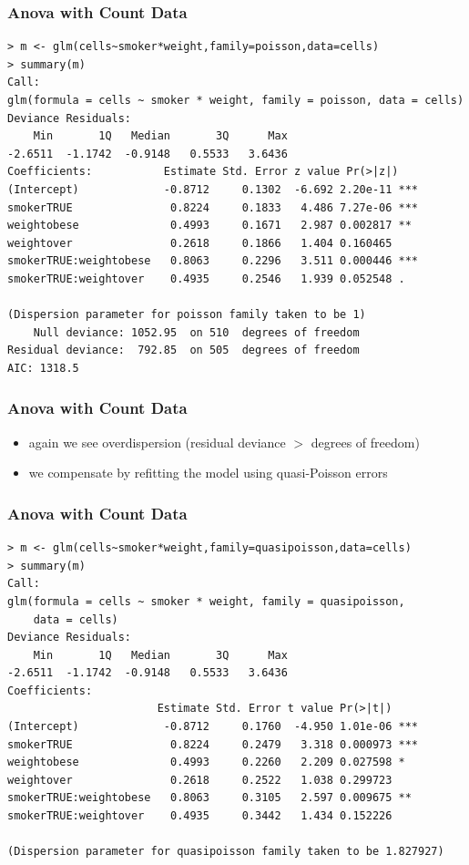 \begin{frame}[fragile]\frametitle{Anova with Count Data}
\footnotesize
\begin{verbatim}
> m <- glm(cells~smoker*weight,family=poisson,data=cells)
> summary(m)
Call:
glm(formula = cells ~ smoker * weight, family = poisson, data = cells)
Deviance Residuals: 
    Min       1Q   Median       3Q      Max  
-2.6511  -1.1742  -0.9148   0.5533   3.6436  
Coefficients:           Estimate Std. Error z value Pr(>|z|)    
(Intercept)             -0.8712     0.1302  -6.692 2.20e-11 ***
smokerTRUE               0.8224     0.1833   4.486 7.27e-06 ***
weightobese              0.4993     0.1671   2.987 0.002817 ** 
weightover               0.2618     0.1866   1.404 0.160465    
smokerTRUE:weightobese   0.8063     0.2296   3.511 0.000446 ***
smokerTRUE:weightover    0.4935     0.2546   1.939 0.052548 .  

(Dispersion parameter for poisson family taken to be 1)
    Null deviance: 1052.95  on 510  degrees of freedom
Residual deviance:  792.85  on 505  degrees of freedom
AIC: 1318.5
\end{verbatim}
\end{frame}




\begin{frame}[fragile]\frametitle{Anova with Count Data}
  \begin{itemize}
  \item again we see overdispersion (residual deviance $>$ degrees of freedom)
  \item we compensate by refitting the model using quasi-Poisson errors
  \end{itemize}
\end{frame}


\begin{frame}[fragile]\frametitle{Anova with Count Data}
\footnotesize
\begin{verbatim}
> m <- glm(cells~smoker*weight,family=quasipoisson,data=cells)
> summary(m)
Call:
glm(formula = cells ~ smoker * weight, family = quasipoisson, 
    data = cells)
Deviance Residuals: 
    Min       1Q   Median       3Q      Max  
-2.6511  -1.1742  -0.9148   0.5533   3.6436  
Coefficients:
                       Estimate Std. Error t value Pr(>|t|)    
(Intercept)             -0.8712     0.1760  -4.950 1.01e-06 ***
smokerTRUE               0.8224     0.2479   3.318 0.000973 ***
weightobese              0.4993     0.2260   2.209 0.027598 *  
weightover               0.2618     0.2522   1.038 0.299723    
smokerTRUE:weightobese   0.8063     0.3105   2.597 0.009675 ** 
smokerTRUE:weightover    0.4935     0.3442   1.434 0.152226    

(Dispersion parameter for quasipoisson family taken to be 1.827927)
\end{verbatim}
\end{frame}

